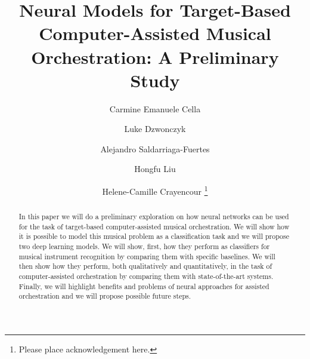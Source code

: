 \documentclass[runningheads,a4paper]{llncs}
\begin{document}
\mainmatter  %

\title{Neural Models for Target-Based Computer-Assisted Musical Orchestration: A Preliminary Study}


%
%
\author{Carmine Emanuele Cella\and Luke Dzwonczyk\and Alejandro Saldarriaga-Fuertes\and Hongfu Liu\and Helene-Camille Crayencour \thanks{Please place acknowledgement here.}}
%


%
%

\maketitle

\begin{abstract}
In this paper we will do a preliminary exploration on how neural networks can be used for the task of target-based computer-assisted musical orchestration. We will show how it is possible to model this  musical problem as a classification task and we will propose two deep learning models. We will show, first, how they perform as classifiers for musical instrument recognition by comparing them with specific baselines. We will then show how they perform, both qualitatively and quantitatively, in the task of computer-assisted orchestration by comparing them with state-of-the-art systems. Finally, we will highlight benefits and problems of neural approaches for assisted orchestration and we will propose possible future steps.
\end{abstract}
%
\end{document}
